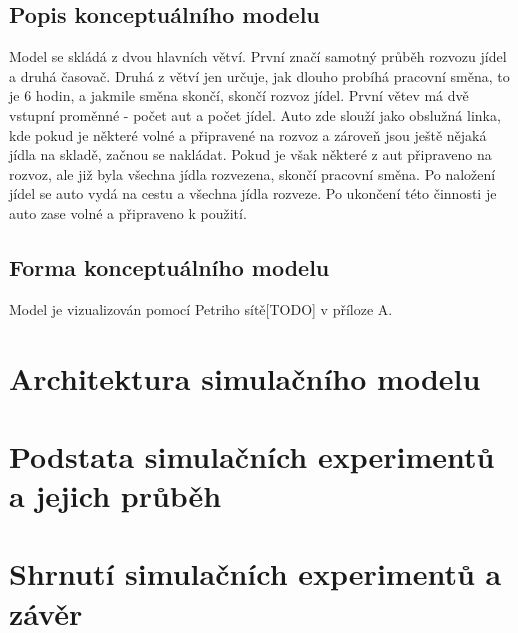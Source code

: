 \documentclass[a4paper, 11pt]{article}
\begin{document}
	\subsection{Popis konceptuálního modelu}

	Model se skládá z dvou hlavních větví. První značí samotný průběh rozvozu jídel a druhá časovač. Druhá z větví jen určuje, jak dlouho probíhá pracovní směna, to je 6 hodin, a jakmile směna skončí, skončí rozvoz jídel. První větev má dvě vstupní proměnné - počet aut a počet jídel. Auto zde slouží jako obslužná linka, kde pokud je některé volné a připravené na rozvoz a zároveň jsou ještě nějaká jídla na skladě, začnou se nakládat. Pokud je však některé z aut připraveno na rozvoz, ale již byla všechna jídla rozvezena, skončí pracovní směna. Po naložení jídel se auto vydá na cestu a všechna jídla rozveze. Po ukončení této činnosti je auto zase volné a připraveno k použití.

	\subsection{Forma konceptuálního modelu}

	Model je vizualizován pomocí Petriho sítě[TODO] v příloze A.




	\section{Architektura simulačního modelu}



	\section{Podstata simulačních experimentů a jejich průběh}




	\section{Shrnutí simulačních experimentů a závěr}



	\clearpage
	
	\renewcommand{\refname}{Literatura}
	
\end{document}
